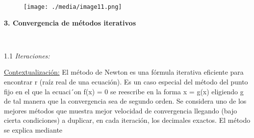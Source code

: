 \documentclass[12pt]{article}
\renewcommand{\_}{\kern-1.5pt\textunderscore\kern-1.5pt}
\begin{document}
\vspace{\baselineskip}
\setlength{\parskip}{8.04pt}

\vspace{\baselineskip}
\setlength{\parskip}{0.0pt}
\setlength{\parskip}{8.04pt}



\begin{figure}[H]
	\begin{Center}
		\texttt{[image: ./media/image11.png]}
	\end{Center}
\end{figure}



\setlength{\parskip}{0.0pt}
\par


\vspace{\baselineskip}
\setlength{\parskip}{8.04pt}

\vspace{\baselineskip}
\setlength{\parskip}{0.0pt}
\setlength{\parskip}{8.04pt}
\setlength{\parskip}{0.0pt}
\begin{justify}
\textbf{3. Convergencia de métodos iterativos}
\end{justify}\par

\begin{justify}
\textbf{\  }{\fontsize{10pt}{12.0pt}\selectfont \textbf{ }1.1 \textit{Iteraciones:}\par}
\end{justify}\par

\begin{adjustwidth}{0.5in}{0.0in}
\begin{justify}
{\fontsize{10pt}{12.0pt}\selectfont \uline{Contextualización:} El método de Newton es una fórmula iterativa eﬁciente para encontrar r (raíz real de una ecuación). Es un caso especial del método del punto ﬁjo en el que la ecuaci´on f(x) = 0 se reescribe en la forma x = g(x) eligiendo g de tal manera que la convergencia sea de segundo orden. Se considera uno de los mejores métodos que muestra mejor velocidad de convergencia llegando (bajo cierta condiciones) a duplicar, en cada iteración, los decimales exactos. El método se explica mediante \par}
\end{justify}\par

\end{adjustwidth}
\end{document}
